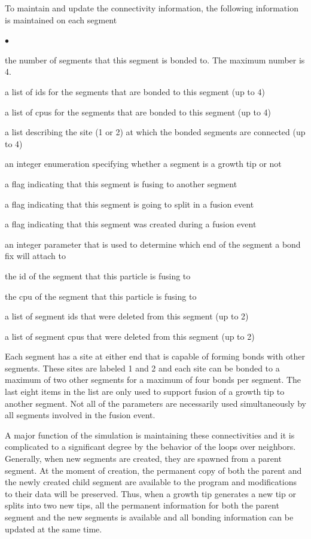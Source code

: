 \documentclass[12pt]{article}
\begin{document}
To maintain and update the connectivity information, the following information is maintained
on each segment
\begin{list}{$\bullet$}{}
\item the number of segments that this segment is bonded to. The maximum number is 4.
\item a list of ids for the segments that are bonded to this segment (up to 4)
\item a list of cpus for the segments that are bonded to this segment (up to 4)
\item a list describing the site (1 or 2) at which the bonded segments are connected (up to 4)
\item an integer enumeration specifying whether a segment is a growth tip or not
\item a flag indicating that this segment is fusing to another segment
\item a flag indicating that this segment is going to split in a fusion event
\item a flag indicating that this segment was created during a fusion event
\item an integer parameter that is used to determine which end of the segment a bond fix will
attach to
\item the id of the segment that this particle is fusing to
\item the cpu of the segment that this particle is fusing to
\item a list of segment ids that were deleted from this segment (up to 2)
\item a list of segment cpus that were deleted from this segment (up to 2)
\end{list}
Each segment has a site at either end that is capable of forming bonds with other segments.
These sites are labeled 1 and 2 and each site can be bonded to a maximum of two other segments
for a maximum of four bonds per segment. The last eight items in the list are only used to
support fusion of a growth tip to another segment. Not all of the parameters are necessarily
used simultaneously by all segments involved in the fusion event.

A major function of the simulation is maintaining these connectivities and it is complicated
to a significant degree by the behavior of the loops over neighbors. Generally, when new
segments are created, they are spawned from a parent segment. At the moment of creation,
the permanent copy of both the parent and the newly created child segment are available
to the program and modifications to their data will be preserved. Thus, when a growth tip
generates a new tip or splits into two new tips, all the permanent information for both the
parent segment and the new segments is available and all bonding information can be updated
at the same time.
\end{document}
